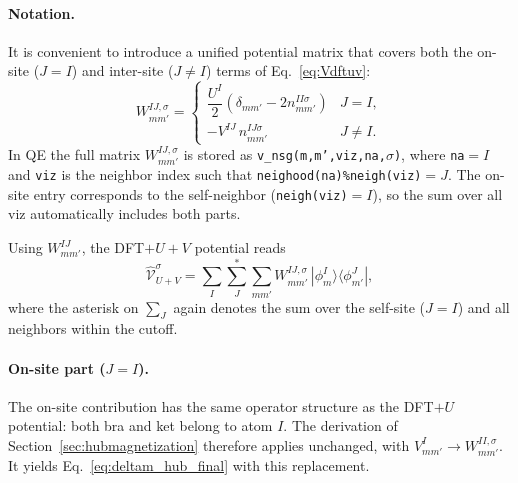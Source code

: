 \documentclass[11pt]{article}
\begin{document}
\paragraph{Notation.}
It is convenient to introduce a unified potential matrix that covers both the
on-site ($J=I$) and inter-site ($J\ne I$) terms of
Eq.~\eqref{eq:Vdftuv}:
\begin{equation}
  W_{mm'}^{IJ,\sigma}
  =
  \begin{cases}
    \dfrac{U^I}{2}\!\left(\delta_{mm'} - 2n_{mm'}^{II\sigma}\right)
    & J = I, \\[6pt]
    -V^{IJ}\,n_{mm'}^{IJ\sigma}
    & J \ne I.
  \end{cases}
  \label{eq:Wmat}
\end{equation}
In QE the full matrix $W_{mm'}^{IJ,\sigma}$ is stored as
\texttt{v\_nsg(m,m',viz,na,$\sigma$)}, where \texttt{na}$=I$ and
\texttt{viz} is the neighbor index such that
\texttt{neighood(na)\%neigh(viz)}$=J$.  The on-site entry corresponds to
the self-neighbor (\texttt{neigh(viz)}$=I$), so the sum over all viz
automatically includes both parts.

Using $W_{mm'}^{IJ}$, the DFT$+U+V$ potential reads
\begin{equation}
  \hat{\mathcal{V}}_{U+V}^{\sigma}
  =
  \sum_{I}\sum_{J}^{*}\sum_{mm'}
  W_{mm'}^{IJ,\sigma}\,
  |\phi^{I}_{m}\rangle\langle\phi^{J}_{m'}|,
  \label{eq:Vuv_compact}
\end{equation}
where the asterisk on $\sum_J$ again denotes the sum over the self-site
($J=I$) and all neighbors within the cutoff.

\paragraph{On-site part ($J=I$).}
The on-site contribution has the same operator structure as the
DFT$+U$ potential: both bra and ket belong to atom $I$.  The
derivation of Section~\ref{sec:hubmagnetization} therefore applies
unchanged, with $V_{mm'}^I \to W_{mm'}^{II,\sigma}$.  It yields
Eq.~\eqref{eq:deltam_hub_final} with this replacement.
\end{document}
